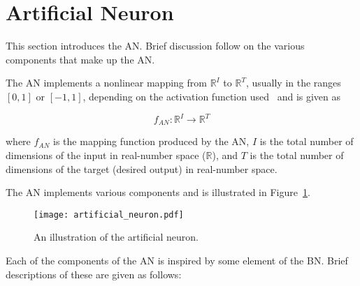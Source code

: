 \section{Artificial Neuron}\label{sec:anns:an}

This section introduces the \acs{AN}. Brief discussion follow on the various components that make up the \acs{AN}.

The \acs{AN} implements a nonlinear mapping from $\mathbb{R}^{I}$ to
$\mathbb{R}^{T}$, usually in the ranges $[0,1]$ or $[-1,1]$, depending on the
activation function used~\cite{ref:engelbrecht:2007} and is given
as

\begin{equation}
      f_{AN} \colon \mathbb{R}^{I} \to \mathbb{R}^{T}
      \label{eq:an_function_mapping}
\end{equation}

where $f_{AN}$ is the mapping function produced by the \acs{AN}, $I$ is the total number of dimensions of the input in real-number space ($\mathbb{R}$), and $T$ is the total number of dimensions of the target (desired output) in real-number space.

The \acs{AN} implements various components and is illustrated in Figure~\ref{fig:artificial_neuron}.

\begin{figure}[htb]
      \centering
      \texttt{[image: artificial\_neuron.pdf]}
      \caption[The artificial neuron]{An illustration of the artificial neuron.}
      \label{fig:artificial_neuron}
\end{figure}

Each of the components of the \acs{AN} is inspired by some element of the \acs{BN}. Brief descriptions of these are given as follows:

